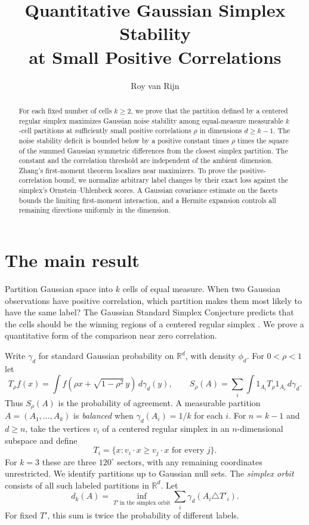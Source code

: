 \documentclass[11pt,reqno]{amsart}
\title[Gaussian simplex stability at small correlations]{Quantitative Gaussian Simplex Stability\\at Small Positive Correlations}
\author{Roy van Rijn}
\date{}
\newcommand{\R}{\mathbb R}
\newcommand{\ga}{\gamma}
\begin{document}
\begin{abstract}
For each fixed number of cells $k\ge2$, we prove that the partition
defined by a centered regular simplex maximizes Gaussian noise stability
among equal-measure measurable $k$-cell partitions at sufficiently small
positive correlations $\rho$ in dimensions $d\ge k-1$. The noise stability
deficit is bounded below by a positive constant times $\rho$ times the
square of the summed Gaussian symmetric differences from the closest
simplex partition. The constant and the correlation threshold are
independent of the ambient dimension.
Zhang's first-moment theorem localizes near maximizers. To prove the
positive-correlation bound, we normalize arbitrary label changes by their
exact loss against the simplex's Ornstein--Uhlenbeck scores. A Gaussian
covariance estimate on the facets bounds the limiting first-moment
interaction, and a Hermite expansion controls all remaining directions
uniformly in the dimension.
\end{abstract}
\maketitle

\section{The main result}

Partition Gaussian space into $k$ cells of equal measure. When two
Gaussian observations have positive correlation, which partition makes
them most likely to have the same label? The Gaussian Standard Simplex
Conjecture predicts that the cells should be the winning regions of a
centered regular simplex \cite[Conjecture~1.4(i)]{IM}. We prove a
quantitative form of the comparison near zero correlation.

Write $\ga_d$ for standard Gaussian probability on $\R^d$, with density
$\phi_d$. For $0<\rho<1$ let
\[
 T_\rho f(x)=\int f(\rho x+\sqrt{1-\rho^2}\,y)\,d\ga_d(y),
 \qquad S_\rho(A)=\sum_i\int 1_{A_i}T_\rho1_{A_i}\,d\ga_d.
\]
Thus $S_\rho(A)$ is the probability of agreement. A measurable partition
$A=(A_1,\ldots,A_k)$ is \emph{balanced} when $\ga_d(A_i)=1/k$ for each
$i$. For $n=k-1$ and $d\ge n$, take the vertices $v_i$ of a centered
regular simplex in an $n$-dimensional subspace and define
\[
 T_i=\{x:v_i\cdot x\ge v_j\cdot x\text{ for every }j\}.
\]
For $k=3$ these are three $120^\circ$ sectors, with any remaining
coordinates unrestricted. We identify partitions up to Gaussian null
sets. The \emph{simplex orbit} consists of all such labeled partitions
in $\R^d$. Let
\[
 d_k(A)=\inf_{T'\ \text{in the simplex orbit}}
             \sum_i\ga_d(A_i\triangle T'_i).
\]
For fixed $T'$, this sum is twice the probability of different labels.
\end{document}
